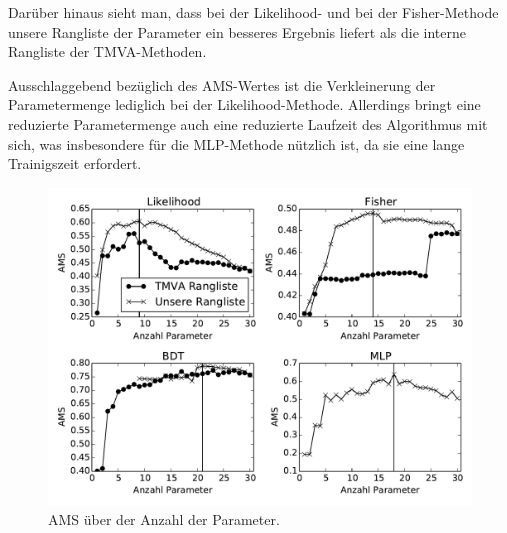 Darüber hinaus sieht man, dass bei der Likelihood- und bei der Fisher-Methode
unsere Rangliste der Parameter ein besseres Ergebnis liefert als die interne
Rangliste der TMVA-Methoden.

Ausschlaggebend bezüglich des AMS-Wertes ist die Verkleinerung der
Parametermenge lediglich bei der Likelihood-Methode. Allerdings bringt eine
reduzierte Parametermenge auch eine reduzierte Laufzeit des Algorithmus mit
sich, was insbesondere für die MLP-Methode nützlich ist, da sie eine lange
Trainigszeit erfordert.




\begin{figure}[htp]
\begin{center}
  \includegraphics[width=\linewidth]{sections/subset_of_parameters/parameter_count_ranking_by_method.pdf}
  \caption[AMS über der Anzahl der Parameter]{AMS über der Anzahl der Parameter.}
  \label{fig:ams_over_parameter_count}
\end{center}
\end{figure}

